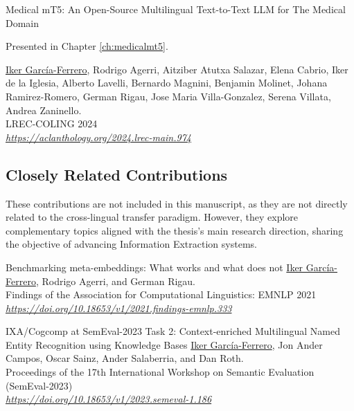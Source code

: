 \begin{part_of_the_thesis}{Medical mT5: An Open-Source Multilingual Text-to-Text LLM for The Medical Domain}
    \begin{smallbox}
        Presented in Chapter \ref{ch:medicalmt5}.
    \end{smallbox}
    \underline{Iker García-Ferrero}, Rodrigo Agerri, Aitziber Atutxa Salazar, Elena Cabrio, Iker de la Iglesia, Alberto Lavelli, Bernardo Magnini, Benjamin Molinet, Johana Ramirez-Romero, German Rigau, Jose Maria Villa-Gonzalez, Serena Villata, Andrea Zaninello. \\
    LREC-COLING 2024 \\
    \textit{\href{https://aclanthology.org/2024.lrec-main.974}{https://aclanthology.org/2024.lrec-main.974}}
    \end{part_of_the_thesis}


\clearpage

\subsection{Closely Related Contributions}
These contributions are not included in this manuscript, as they are not directly related to the cross-lingual transfer paradigm. However, they explore complementary topics aligned with the thesis’s main research direction, sharing the objective of advancing Information Extraction systems.

\begin{not_part_of_the_thesis}{Benchmarking meta-embeddings: What works and what does not}
    \underline{Iker García-Ferrero}, Rodrigo Agerri, and German Rigau. \\
    Findings of the Association for Computational Linguistics: EMNLP 2021 \\
    \textit{\href{https://doi.org/10.18653/v1/2021.findings-emnlp.333}{https://doi.org/10.18653/v1/2021.findings-emnlp.333}}
\end{not_part_of_the_thesis}

\begin{not_part_of_the_thesis}{	
    IXA/Cogcomp at SemEval-2023 Task 2: Context-enriched Multilingual Named Entity Recognition using Knowledge Bases}
    \underline{Iker García-Ferrero}, Jon Ander Campos, Oscar Sainz, Ander Salaberria, and Dan Roth. \\
    Proceedings of the 17th International Workshop on Semantic Evaluation (SemEval-2023) \\
    \textit{\href{https://doi.org/10.18653/v1/2023.semeval-1.186}{https://doi.org/10.18653/v1/2023.semeval-1.186}}
\end{not_part_of_the_thesis}

